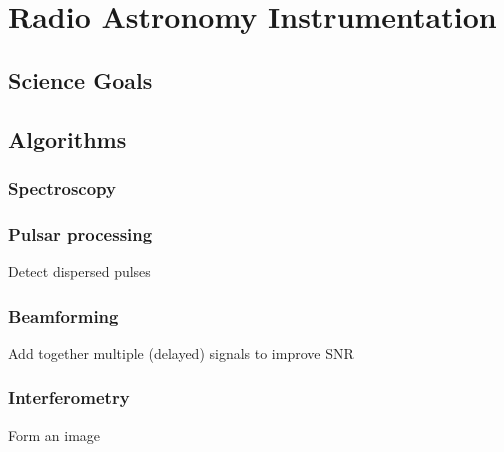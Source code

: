 \chapter{Radio Astronomy Instrumentation}

\section{Science Goals}
\subsection{}
\subsection{}
\subsection{}

\section{Algorithms}
\subsection{Spectroscopy}
\subsection{Pulsar processing}
Detect dispersed pulses
\subsection{Beamforming}
Add together multiple (delayed) signals to improve SNR
\subsection{Interferometry}
Form an image

